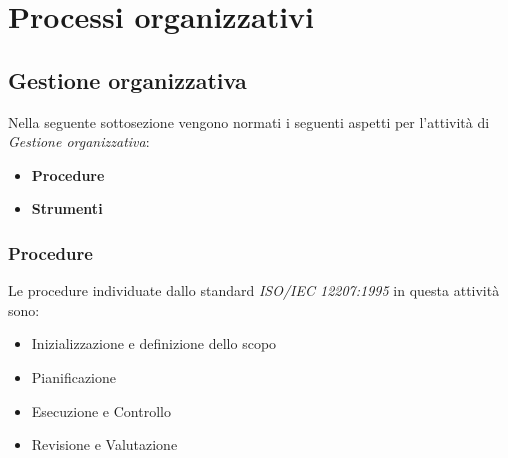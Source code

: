 \section{Processi organizzativi}

\subsection{Gestione organizzativa}
Nella seguente sottosezione vengono normati i seguenti aspetti per l'attività di \textit{Gestione organizzativa}:
\begin{itemize}
    \item \textbf{Procedure}
    \item \textbf{Strumenti}
\end{itemize}

\subsubsection{Procedure}
Le procedure individuate dallo standard \textit{ISO/IEC 12207:1995} in questa attività sono:
\begin{itemize}
    \item Inizializzazione e definizione dello scopo
    \item Pianificazione
    \item Esecuzione e Controllo
    \item Revisione e Valutazione
\end{itemize}


